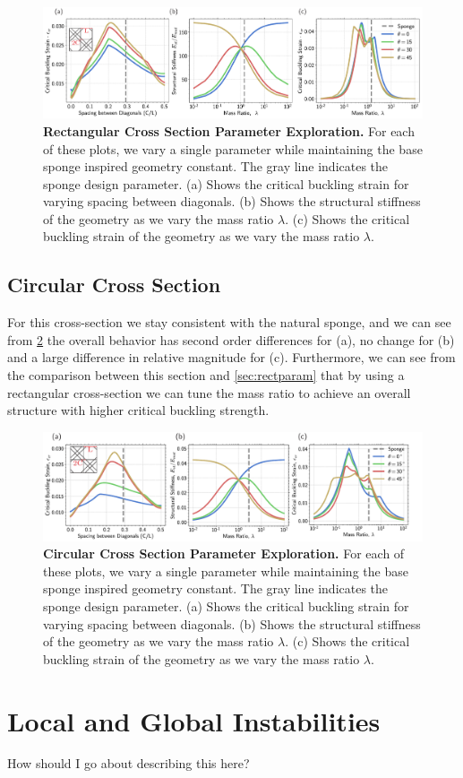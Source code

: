 \documentclass[10pt,twoside]{fernandes_supp}
\newcommand{\mf}[1]{\colorbox{blue!10}{\color{color3}#1}}
\begin{document}
\begin{figure}
	\centering
	\includegraphics[width=0.9\linewidth]{SFig8.pdf}
	\caption{{\bf Rectangular Cross Section Parameter Exploration.} For each of these plots, we vary a single parameter while maintaining the base sponge inspired geometry constant. The gray line indicates the sponge design parameter. (a) Shows the critical buckling strain for varying spacing between diagonals. (b) Shows the structural stiffness of the geometry as we vary the mass ratio $\lambda$. (c) Shows the critical buckling strain of the geometry as we vary the mass ratio $\lambda$.}
	\label{SquareCrossSectionParameter}
\end{figure}

\subsection{Circular Cross Section}
For this cross-section we stay consistent with the natural sponge, and we can see from \cref{CircularCrossSectionParameter} the overall behavior has second order differences for (a), no change for (b) and a large difference in relative magnitude for (c).  Furthermore, we can see from the comparison between this section and \cref{sec:rectparam} that by using a rectangular cross-section we can tune the mass ratio to achieve an overall structure with higher critical buckling strength. 

\begin{figure}
	\centering
	\includegraphics[width=0.9\linewidth]{SFig9.pdf}
	\caption{{\bf Circular Cross Section Parameter Exploration.} For each of these plots, we vary a single parameter while maintaining the base sponge inspired geometry constant. The gray line indicates the sponge design parameter. (a) Shows the critical buckling strain for varying spacing between diagonals. (b) Shows the structural stiffness of the geometry as we vary the mass ratio $\lambda$. (c) Shows the critical buckling strain of the geometry as we vary the mass ratio $\lambda$.}
	\label{CircularCrossSectionParameter}
\end{figure}

\section{Local and Global Instabilities}
\mf{How should I go about describing this here?}




% 
\end{document}
